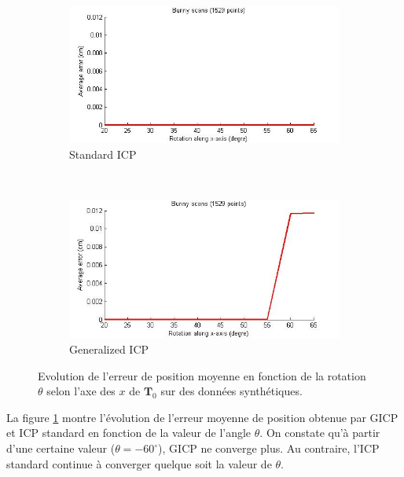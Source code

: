 \begin{figure}[!h]
   \centering
   \begin{subfigure}[t]{.5\linewidth}
     \centering
     \includegraphics[scale=0.4]{Images/Resultats/bunny_offset_evol-error_sicp.jpg}
     \caption{Standard ICP}
   \end{subfigure}%
   ~
   \begin{subfigure}[t]{.5\linewidth}
     \centering
     \includegraphics[scale=0.4]{Images/Resultats/bunny_offset_evol-error_gicp.jpg}
     \caption{Generalized ICP}
   \end{subfigure}
   
   \caption{Evolution de l'erreur de position moyenne en fonction de la rotation $\theta$ selon l'axe des $x$ de $\mathbf{T}_0$ sur des données synthétiques.}
   \label{fig:offset}
\end{figure}


La figure \ref{fig:offset} montre l'évolution de l'erreur moyenne de position obtenue par GICP et ICP standard en fonction de la valeur de l'angle $\theta$. On constate qu'à partir d'une certaine valeur ($\theta = -60^{\circ}$), GICP ne converge plus. Au contraire, l'ICP standard continue à converger quelque soit la valeur de $\theta$.

